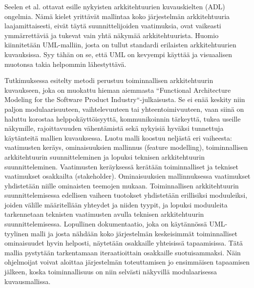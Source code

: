 \documentclass[finnish]{tktltiki2}
\theoremstyle{definition}
\theoremstyle{remark}
\begin{document}
\iffalse
Nykyisestä kirjallisuudesta he etsivät materiaalia tutkimuksen tueksi funktionaalisen arkkitehtuurin mallinnuksesta ja vaatimuksista ohjelmistoarkkitehtuurin mallinnuksessa.
Funktionaalisen arkkitehtuurin mallinuksesta he viittaavat Brinkkemperin tutkimukseen, jossa tutkittiin funktionaalisen arkkitehtuurin diagrammien käyttöä ja jonka tulos oli, että niiden käyttö on rajoittunutta tiettyihin alueisiin ja usein rakenteiltaan sekavahkoa. He jatkavat viittaamalla myös Vlietin tutkimukseen, jossa tultiin päätelmään, että arkkitehtuurin suunnittelun pitäisi sijaita vaatimusten keräysten ja teknisen suunnittelun välissä. 
Vaatimuksista 
\fi

Seelen et al. ottavat esille nykyisten arkkitehtuurien kuvauskielten (ADL) ongelmia. Nämä kielet yrittävät mallintaa koko järjestelmän arkkitehtuuria laajamittaisesti, eivät täytä suunnittelijoiden vaatimuksia, ovat vaikeasti ymmärrettäviä ja tukevat vain yhtä näkymää arkkitehtuurista. Huomio kiinnitetään UML-malliin, josta on tullut standardi erilaisten arkkitehtuurien kuvauksissa. Syy tähän on se, että UML on kevyempi käyttää ja visuaalisen muotonsa takia helpommin lähestyttävä.

Tutkimuksessa esitelty metodi perustuu toiminnallisen arkkitehtuurin kuvaukseen, joka on muokattu hieman aiemmasta ``Functional Architecture Modeling for the Software Product Industry``-julkaisusta. Se ei enää keskity niin paljon modulaarisuuteen, vaihtelevuuteen tai yhteentoimivuuteen, vaan siinä on haluttu korostaa helppokäyttöisyyttä, kommunikoinnin tärkeyttä, tukea useille näkymille, rajoittavuuden vähentämistä sekä nykyisiä hyväksi tunnettuja käytänteitä mallien kuvauksessa. Luotu malli koostuu neljästä eri vaiheesta: vaatimusten keräys, ominaisuuksien mallinnus (feature modelling), toiminnallisen arkkitehtuurin suunnitteleminen ja lopuksi teknisen arkkitehtuurin suunnitteleminen. Vaatimusten keräyksessä kerätään toiminnalliset ja tekniset vaatimukset osakkailta (stakeholder). Ominaisuuksien mallinnuksessa vaatimukset yhdistetään niille ominaisten teemojen mukaan. Toiminnallisen arkkitehtuurin suunnittelemisessa edellisen vaiheen tuotokset yhdistetään erillisiksi moduuleiksi, joiden välille määritellään yhteydet ja niiden tyypit, ja lopuksi moduuleita tarkennetaan teknisten vaatimusten avulla teknisen arkkitehtuurin suunnittelemisessa. Lopullinen dokumentaatio, joka on käytännössä UML-tyylinen malli ja josta nähdään koko järjestelmän keskeisimmät toiminnalliset ominaisuudet hyvin helposti, näytetään osakkaille yhteisissä tapaamisissa. Tätä mallia pystytään tarkentamaan iteraatioittain osakkaille suotuisammaksi. Näin ohjelmoijat voivat aloittaa järjestelmän toteuttamisen jo ensimmäisen tapaamisen jälkeen, koska toiminnallisuus on niin selvästi näkyvillä modulaarisessa kuvausmallissa. 
\end{document}
